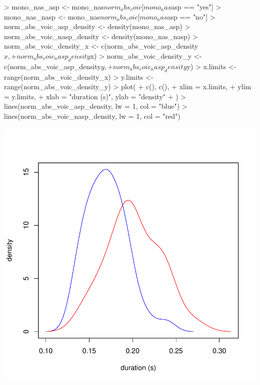 \documentclass[a4paper,11pt]{article}
\begin{document}
\begin{Schunk}
\begin{Sinput}
> mono_nas_asp <- mono_nas$norm_abs_voic[mono_nas$asp == "yes"]
> mono_nas_nasp <- mono_nas$norm_abs_voic[mono_nas$asp == "no"]
> norm_abs_voic_asp_density <- density(mono_nas_asp)
> norm_abs_voic_nasp_density <- density(mono_nas_nasp)
> norm_abs_voic_density_x <- c(norm_abs_voic_asp_density$x, 
+                                   norm_abs_voic_nasp_density$x)
> norm_abs_voic_density_y <- c(norm_abs_voic_asp_density$y, 
+                                   norm_abs_voic_nasp_density$y)
> x.limits <- range(norm_abs_voic_density_x)
> y.limits <- range(norm_abs_voic_density_y)
> plot(
+ c(), c(),
+ xlim = x.limits,
+ ylim = y.limits,
+ xlab = "duration (s)", ylab = "density"
+ )
> lines(norm_abs_voic_asp_density, lw = 1, col = "blue")
> lines(norm_abs_voic_nasp_density, lw = 1, col = "red")
\end{Sinput}
\end{Schunk}
\includegraphics{analysis-011}
\end{document}
